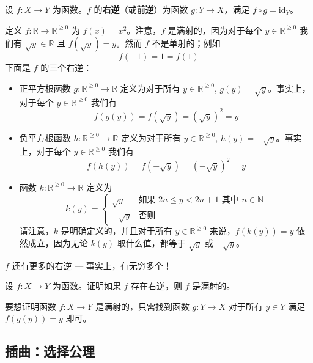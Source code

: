 \begin{definition}
\label{defRightInverse}
设 $f : X \to Y$ 为函数。$f$ 的\textbf{右逆}（或\textbf{前逆}）为函数 $g : Y \to X$，满足 $f \circ g = \mathrm{id}_Y$。
\end{definition}

\begin{example}
定义 $f : \mathbb{R} \to \mathbb{R}^{\ge 0}$ 为 $f(x)=x^2$。注意，$f$ 是满射的，因为对于每个 $y \in \mathbb{R}^{\ge 0}$ 我们有 $\sqrt{y} \in \mathbb{R}$ 且 $f(\sqrt{y}) = y$。然而 $f$ 不是单射的；例如
\[ f(-1) = 1 = f(1) \]
下面是 $f$ 的三个右逆：
\begin{itemize}
\item 正平方根函数 $g : \mathbb{R}^{\ge 0} \to \mathbb{R}$ 定义为对于所有 $y \in \mathbb{R}^{\ge 0}$, $g(y)=\sqrt{y}$。事实上，对于每个 $y \in \mathbb{R}^{\ge 0}$ 我们有
\[ f(g(y)) = f(\sqrt{y}) = (\sqrt{y})^2 = y \]
\item 负平方根函数 $h : \mathbb{R}^{\ge 0} \to \mathbb{R}$ 定义为对于所有 $y \in \mathbb{R}^{\ge 0}$, $h(y)=-\sqrt{y}$。事实上，对于每个 $y \in \mathbb{R}^{\ge 0}$ 我们有
\[ f(h(y)) = f(-\sqrt{y}) = (-\sqrt{y})^2 = y \]
\item 函数 $k : \mathbb{R}^{\ge 0} \to \mathbb{R}$ 定义为
\[ k(y) = \begin{cases}
\sqrt{y} & \text{如果 } 2n \le y < 2n+1 \text{ 其中 } n \in \mathbb{N} \\
-\sqrt{y} & \text{否则}
\end{cases} \]
请注意，$k$ 是明确定义的，并且对于所有 $y \in \mathbb{R}^{\ge 0}$ 来说，$f(k(y)) = y$ 依然成立，因为无论 $k(y)$ 取什么值，都等于 $\sqrt{y}$ 或 $-\sqrt{y}$。
\end{itemize}
$f$ 还有更多的右逆 --- 事实上，有无穷多个！
\end{example}

\begin{exercise}
设 $f : X \to Y$ 为函数。证明如果 $f$ 存在右逆，则 $f$ 是满射的。
\end{exercise}

\begin{strategy}[通过右逆证明函数为满射]
要想证明函数 $f : X \to Y$ 是满射的，只需找到函数 $g : Y \to X$ 对于所有 $y \in Y$ 满足 $f(g(y)) = y$ 即可。
\end{strategy}

\subsection*{插曲：选择公理}

